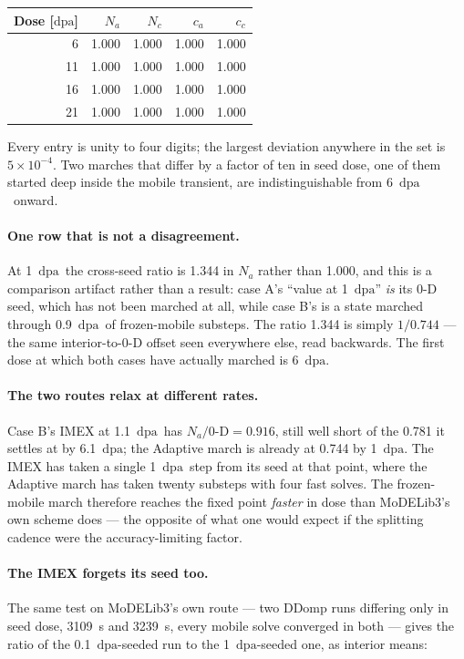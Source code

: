 \documentclass[11pt,a4paper]{article}
\newcommand{\dpa}{\ensuremath{\mathrm{dpa}}}
\begin{document}
\begin{center}
\begin{tabular}{rrrrr}
\toprule
Dose [\dpa] & $N_a$ & $N_c$ & $c_a$ & $c_c$ \\
\midrule
 6 & 1.000 & 1.000 & 1.000 & 1.000 \\
11 & 1.000 & 1.000 & 1.000 & 1.000 \\
16 & 1.000 & 1.000 & 1.000 & 1.000 \\
21 & 1.000 & 1.000 & 1.000 & 1.000 \\
\bottomrule
\end{tabular}
\end{center}

\noindent
Every entry is unity to four digits; the largest deviation anywhere in the set
is $5\times10^{-4}$. Two marches that differ by a factor of ten in seed dose,
one of them started deep inside the mobile transient, are indistinguishable from
6~\dpa\ onward.

\paragraph{One row that is not a disagreement.} At 1~\dpa\ the cross-seed ratio
is 1.344 in $N_a$ rather than 1.000, and this is a comparison artifact rather
than a result: case A's ``value at 1~\dpa'' \emph{is} its 0-D seed, which has not
been marched at all, while case B's is a state marched through 0.9~\dpa\ of
frozen-mobile substeps. The ratio 1.344 is simply $1/0.744$ --- the same
interior-to-0-D offset seen everywhere else, read backwards. The first dose at
which both cases have actually marched is 6~\dpa.

\paragraph{The two routes relax at different rates.} Case B's IMEX at
1.1~\dpa\ has $N_a/0\text{-D}=0.916$, still well short of the 0.781 it settles
at by 6.1~\dpa; the Adaptive march is already at 0.744 by 1~\dpa. The IMEX
has taken a single 1~\dpa\ step from its seed at that point, where the Adaptive
march has taken twenty substeps with four fast solves. The frozen-mobile march
therefore reaches the fixed point \emph{faster} in dose than MoDELib3's own
scheme does --- the opposite of what one would expect if the splitting cadence
were the accuracy-limiting factor.

\paragraph{The IMEX forgets its seed too.} The same test on MoDELib3's own
route --- two DDomp runs differing only in seed dose, 3109~s and 3239~s, every
mobile solve converged in both --- gives the ratio of the 0.1~\dpa-seeded run to
the 1~\dpa-seeded one, as interior means:
\end{document}
